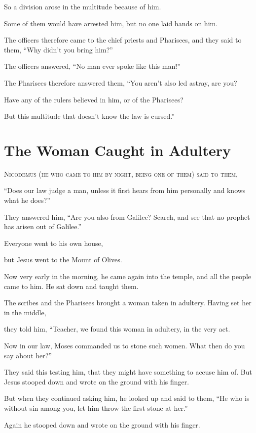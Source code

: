 So a division arose in the multitude because of him.

Some of them would have arrested him, but no one laid hands on him.

The officers therefore came to the chief priests and Pharisees, and they said to them, “Why didn’t you bring him?”

The officers answered, “No man ever spoke like this man!”

The Pharisees therefore answered them, “You aren’t also led astray, are you?

Have any of the rulers believed in him, or of the Pharisees?

But this multitude that doesn’t know the law is cursed.”


\clearpage \section*{The Woman Caught in Adultery}

\lettrine{N}{icodemus (he who came to him by night, being one of them) said to them,}

“Does our law judge a man, unless it first hears from him personally and knows what he does?”

They answered him, “Are you also from Galilee? Search, and see that no prophet has arisen out of Galilee.”

Everyone went to his own house,

but Jesus went to the Mount of Olives.

Now very early in the morning, he came again into the temple, and all the people came to him. He sat down and taught them.

The scribes and the Pharisees brought a woman taken in adultery. Having set her in the middle,

they told him, “Teacher, we found this woman in adultery, in the very act.

Now in our law, Moses commanded us to stone such women. What then do you say about her?”

They said this testing him, that they might have something to accuse him of. But Jesus stooped down and wrote on the ground with his finger.

But when they continued asking him, he looked up and said to them, “He who is without sin among you, let him throw the first stone at her.”

Again he stooped down and wrote on the ground with his finger.

